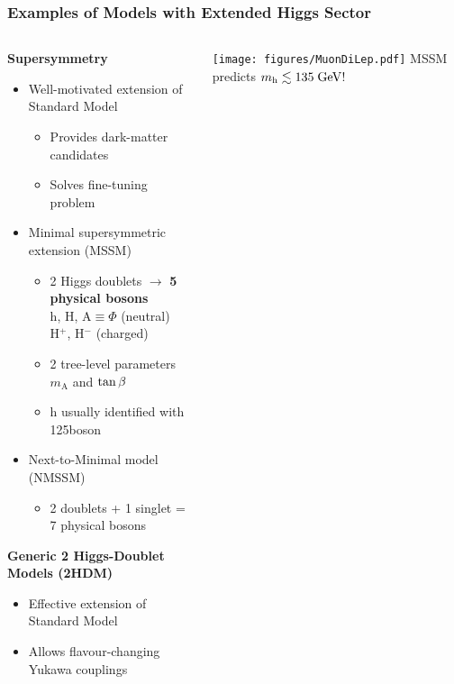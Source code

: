 \documentclass{beamer}
\begin{document}
\begin{frame}
  \frametitle{Examples of Models with Extended Higgs Sector}
  \begin{columns}[T]
    \begin{column}{0.7\textwidth}
      \textbf{Supersymmetry}
      \begin{itemize}
      \item Well-motivated extension of Standard Model
        \begin{itemize}
        \item[\greencheck] Provides dark-matter candidates
        \item[\greencheck] Solves fine-tuning problem
        \end{itemize}
      \item Minimal supersymmetric extension (MSSM)
        \begin{itemize}
        \item 2 Higgs doublets $\rightarrow$ \textbf{5 physical bosons}\\
          \hskip3.1cm h, H, $\text{A}\equiv\Phi$ (neutral)\\
          \hskip3.1cm H$^{+}$, H$^{-}$ (charged)
        \item 2 tree-level parameters $m_{\text{A}}$ and $\tan\beta$
        \item h usually identified with 125\gev boson
        \end{itemize}
      \item Next-to-Minimal model (NMSSM)
        \begin{itemize}
        \item 2 doublets + 1 singlet = 7 physical bosons
        \end{itemize}
      \end{itemize}
      \textbf{Generic 2 Higgs-Doublet Models (2HDM)}
      \begin{itemize}
      \item Effective extension of Standard Model
      \item Allows flavour-changing Yukawa couplings
      \end{itemize}
    \end{column}
    \begin{column}{0.3\textwidth}
      \centering
      \texttt{[image: figures/MuonDiLep.pdf]}
      \vskip0.2cm
      {\small MSSM predicts $m_{\text{h}}\lesssim135\;\text{Ge}\kern-0.06667em\text{V}$!}
    \end{column}
  \end{columns}
\end{frame}
\end{document}

